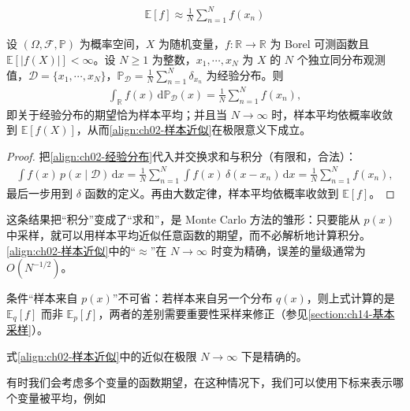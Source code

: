 \documentclass[../../main.tex]{subfiles}
\begin{document}
\begin{align}
  \mathbb{E}[f] \approx \frac{1}{N}\sum_{n=1}^{N} f(x_n)
  \label{align:ch02-样本近似}
\end{align}

\begin{proposition}[期望的样本近似]\label{proposition:ch02-期望的样本近似}
设 $(\Omega,\mathcal{F},\mathbb{P})$ 为概率空间，$X$ 为随机变量，$f:\mathbb{R}\to\mathbb{R}$ 为 Borel 可测函数且 $\mathbb{E}[|f(X)|]<\infty$。设 $N\geqslant1$ 为整数，$x_1,\cdots,x_N$ 为 $X$ 的 $N$ 个独立同分布观测值，$\mathcal{D}=\{x_1,\cdots,x_N\}$，$\mathbb{P}_{\mathcal{D}}=\frac{1}{N}\sum_{n=1}^{N}\delta_{x_n}$ 为经验分布。则
\begin{align*}
  \int_{\mathbb{R}}f(x)\,\mathrm{d}\mathbb{P}_{\mathcal{D}}(x)=\frac{1}{N}\sum_{n=1}^{N}f(x_n),
\end{align*}
即关于经验分布的期望恰为样本平均；并且当 $N\to\infty$ 时，样本平均依概率收敛到 $\mathbb{E}[f(X)]$，从而\eqref{align:ch02-样本近似}在极限意义下成立。
\end{proposition}

\begin{proof}
把\eqref{align:ch02-经验分布}代入并交换求和与积分（有限和，合法）：
\begin{align*}
 \int f(x)\,p(x\mid\mathcal{D})\,\mathrm{d}x
 = \frac{1}{N}\sum_{n=1}^{N}\int f(x)\,\delta(x-x_n)\,\mathrm{d}x
 = \frac{1}{N}\sum_{n=1}^{N} f(x_n) ,
\end{align*}
最后一步用到 $\delta$ 函数的定义。再由大数定律，样本平均依概率收敛到 $\mathbb{E}[f]$。
\end{proof}

\begin{remark}
这条结果把“积分”变成了“求和”，是 Monte Carlo 方法的雏形：只要能从 $p(x)$ 中采样，就可以用样本平均近似任意函数的期望，而不必解析地计算积分。\eqref{align:ch02-样本近似}中的“$\approx$”在 $N\to\infty$ 时变为精确，误差的量级通常为 $O(N^{-1/2})$。

条件“样本来自 $p(x)$”不可省：若样本来自另一个分布 $q(x)$，则上式计算的是 $\mathbb{E}_q[f]$ 而非 $\mathbb{E}_p[f]$，两者的差别需要重要性采样来修正（参见\cref{section:ch14-基本采样}）。
\end{remark}

式\eqref{align:ch02-样本近似}中的近似在极限 $N\to\infty$ 下是精确的。

有时我们会考虑多个变量的函数期望，在这种情况下，我们可以使用下标来表示哪个变量被平均，例如
\end{document}
